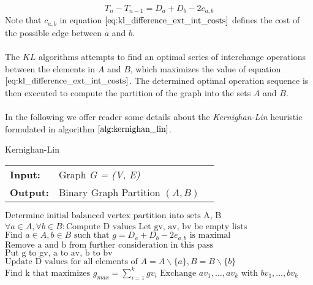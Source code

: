 \begin{equation}
	T_{n} - T_{n-1} = D_a + D_b - 2c_{a,b}
\label{eq:kl_difference_ext_int_costs}
\end{equation}
Note that $c_{a,b}$ in equation $\ref{eq:kl_difference_ext_int_costs}$ defines the cost of the possible edge between $a$ and $b$. \\ \\
The $KL$ algorithms attempts to find an optimal series of interchange operations between the elements in $A$ and $B$, which maximizes the value of equation $\ref{eq:kl_difference_ext_int_costs}$. The determined optimal operation sequence is then executed to compute the partition of the graph into the sets $A$ and $B$. \\ \\
In the following we offer reader some details about the \emph{Kernighan-Lin} heuristic formulated in algorithm $\ref{alg:kernighan_lin}$. 
\begin{algorithm}[H]
\caption{Kernighan-Lin}
\begin{table}[H]
  \begin{tabular}{@{}lll@{}}
    \textbf{Input:} & Graph \emph{G = (V, E)} \\
    \textbf{Output:} & Binary Graph Partition $\left( A, B \right)$ \\
  \end{tabular} 
\end{table}
\setlength{\fboxrule}{0pt} 
\begin{boxedminipage}{1.0\textwidth}
  \begin{algorithmic}[1]
  	  \State $\text{Determine initial balanced vertex partition into sets A, B}$
      \Do
		\State $\forall a \in A, \forall b \in B: \text{Compute D values}$
		\State $\text{Let gv, av, bv be empty lists}$
			\State $\text{Find } a \in A, b \in B \text{ such that } g = D_a + D_b - 2e_{a,b} \text{ is maximal}$
			\State $\text{Remove a and b from further consideration in this pass}$
			\State $\text{Put g to gv, a to av, b to bv}$
			\State $\text{Update D values for all elements of } A = A \backslash \{a\}, B = B \backslash \{b\}$
		\EndFor
		\State $\text{Find k that maximizes } g_{max} = \sum_{i=1}^k gv_i$
			\State $\text{Exchange } av_1,\dots, av_k \text{ with } bv_1,\dots, bv_k$  
		\EndIf	
  \end{algorithmic}
  \end{boxedminipage}
  \vskip1.5pt
\label{alg:kernighan_lin}
\end{algorithm}
